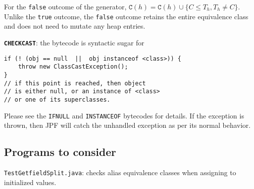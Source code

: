 For the \texttt{false} outcome of the generator, $\mathtt{C}(h) = \mathtt{C}(h) \cup \{C \leq T_h, T_h \not = C\}$. Unlike the \texttt{true} outcome, the \texttt{false} outcome retains the entire equivalence class and does not need to mutate any heap entries.

\noindent\textbf{\texttt{CHECKCAST}}: the bytecode is syntactic sugar for 
\begin{lstlisting}
if (! (obj == null  ||  obj instanceof <class>)) {
    throw new ClassCastException();
}
// if this point is reached, then object 
// is either null, or an instance of <class> 
// or one of its superclasses.
\end{lstlisting}
Please see the \texttt{IFNULL} and \texttt{INSTANCEOF} bytecodes for details. If the exception is thrown, then JPF will catch the unhandled exception as per its normal behavior.

\subsection{Programs to consider}
\begin{compactitem}
\item \texttt{TestGetfieldSplit.java}: checks alias equivalence classes when assigning to initialized values.
\end{compactitem}